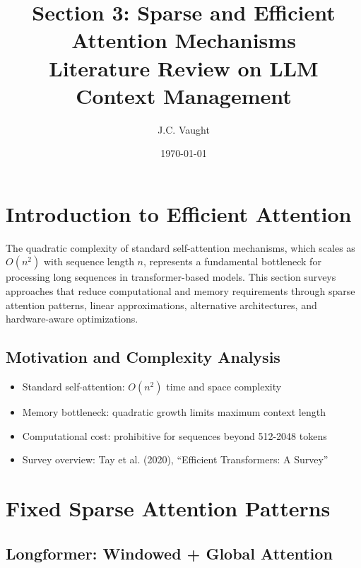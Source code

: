 \documentclass[11pt]{article}
\title{\textbf{\color{Garnet}Section 3: Sparse and Efficient Attention Mechanisms}\\
\large{Literature Review on LLM Context Management}}
\author{J.C. Vaught}
\date{\today}
\begin{document}
\maketitle

\section{Introduction to Efficient Attention}

The quadratic complexity of standard self-attention mechanisms, which scales as $O(n^2)$ with sequence length $n$, represents a fundamental bottleneck for processing long sequences in transformer-based models. This section surveys approaches that reduce computational and memory requirements through sparse attention patterns, linear approximations, alternative architectures, and hardware-aware optimizations.

\subsection{Motivation and Complexity Analysis}

\begin{itemize}[leftmargin=*]
    \item Standard self-attention: $O(n^2)$ time and space complexity
    \item Memory bottleneck: quadratic growth limits maximum context length
    \item Computational cost: prohibitive for sequences beyond 512-2048 tokens
    \item Survey overview: Tay et al. (2020), ``Efficient Transformers: A Survey''~\cite{tay2020efficient}
\end{itemize}

\section{Fixed Sparse Attention Patterns}

\subsection{Longformer: Windowed + Global Attention}
\end{document}
